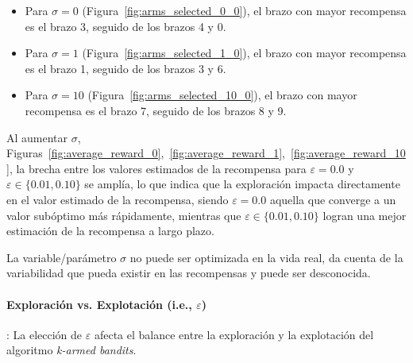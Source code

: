 \documentclass[12pt]{article}
\begin{document}
    \begin{itemize}
        \item Para $\sigma = 0$ (Figura~\ref{fig:arms_selected_0_0}), el brazo con mayor recompensa es el brazo 3, seguido de los brazos 4 y 0.
        \item Para $\sigma = 1$ (Figura~\ref{fig:arms_selected_1_0}), el brazo con mayor recompensa es el brazo 1, seguido de los brazos 3 y 6.
        \item Para $\sigma = 10$ (Figura~\ref{fig:arms_selected_10_0}), el brazo con mayor recompensa es el brazo 7, seguido de los brazos 8 y 9.
    \end{itemize}

    Al aumentar $\sigma$, Figuras~\ref{fig:average_reward_0},~\ref{fig:average_reward_1},~\ref{fig:average_reward_10}, la brecha entre los valores estimados de la recompensa para $\varepsilon = 0.0$ y $\varepsilon \in \{0.01, 0.10\}$ se amplía, lo que indica que la exploración impacta directamente en el valor estimado de la recompensa, siendo $\varepsilon=0.0$ aquella que converge a un valor subóptimo más rápidamente, mientras que $\varepsilon \in \{0.01, 0.10\}$ logran una mejor estimación de la recompensa a largo plazo.

    La variable/parámetro $\sigma$ no puede ser optimizada en la vida real, da cuenta de la variabilidad que pueda existir en las recompensas y puede ser desconocida.

    \paragraph{Exploración vs. Explotación (i.e., $\varepsilon$)}:
    La elección de $\varepsilon$ afecta el balance entre la exploración y la explotación del algoritmo \textit{k-armed bandits}.
\end{document}
